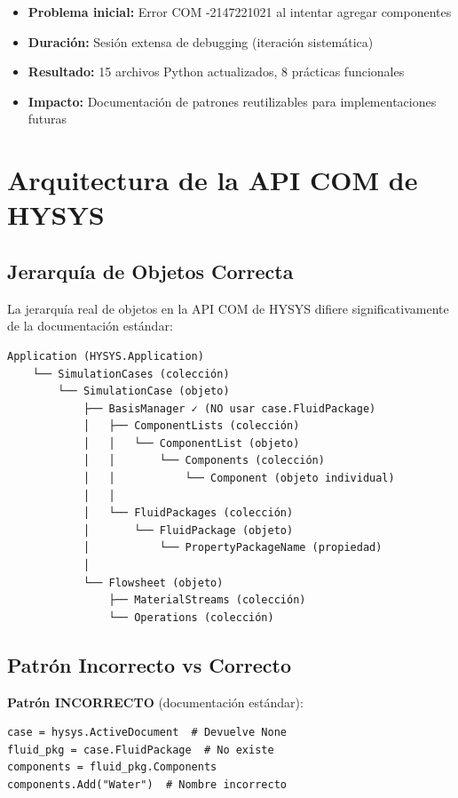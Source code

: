 \documentclass[12pt,a4paper]{article}
\begin{document}
\begin{itemize}
    \item \textbf{Problema inicial:} Error COM -2147221021 al intentar agregar componentes
    \item \textbf{Duración:} Sesión extensa de debugging (iteración sistemática)
    \item \textbf{Resultado:} 15 archivos Python actualizados, 8 prácticas funcionales
    \item \textbf{Impacto:} Documentación de patrones reutilizables para implementaciones futuras
\end{itemize}

\section{Arquitectura de la API COM de HYSYS}

\subsection{Jerarquía de Objetos Correcta}

La jerarquía real de objetos en la API COM de HYSYS difiere significativamente de la documentación estándar:

\begin{verbatim}
Application (HYSYS.Application)
    └── SimulationCases (colección)
        └── SimulationCase (objeto)
            ├── BasisManager ✓ (NO usar case.FluidPackage)
            │   ├── ComponentLists (colección)
            │   │   └── ComponentList (objeto)
            │   │       └── Components (colección)
            │   │           └── Component (objeto individual)
            │   │
            │   └── FluidPackages (colección)
            │       └── FluidPackage (objeto)
            │           └── PropertyPackageName (propiedad)
            │
            └── Flowsheet (objeto)
                ├── MaterialStreams (colección)
                └── Operations (colección)
\end{verbatim}

\subsection{Patrón Incorrecto vs Correcto}

\begin{warningbox}
\textbf{Patrón INCORRECTO} (documentación estándar):
\begin{lstlisting}
case = hysys.ActiveDocument  # Devuelve None
fluid_pkg = case.FluidPackage  # No existe
components = fluid_pkg.Components
components.Add("Water")  # Nombre incorrecto
\end{lstlisting}
\end{warningbox}
\end{document}
